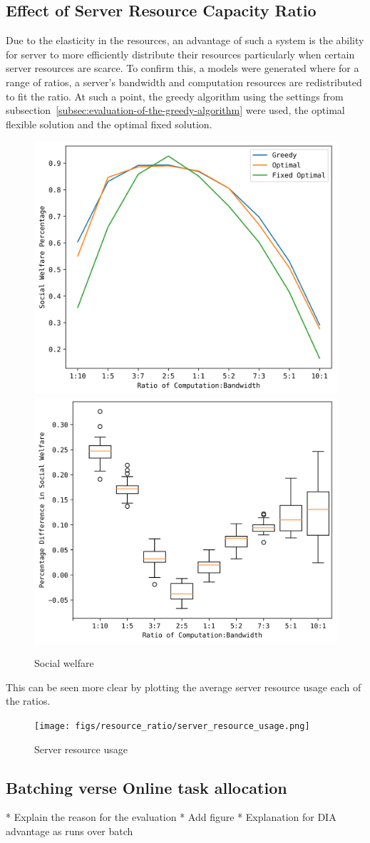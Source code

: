 \subsection{Effect of Server Resource Capacity Ratio}
\label{subsec:affect-of-server-resource-capacity-ratio}
Due to the elasticity in the resources, an advantage of such a system is the ability for server to more efficiently
distribute their resources particularly when certain server resources are scarce. To confirm this, a models were
generated where for a range of ratios, a server's bandwidth and computation resources are redistributed to fit the
ratio. At such a point, the greedy algorithm using the settings from
subsection~\ref{subsec:evaluation-of-the-greedy-algorithm} were used, the optimal flexible solution and the optimal
fixed solution.

\begin{figure}[h]
    \centering
    \includegraphics[width=0.45\linewidth]{figs/resource_ratio/social_welfare_percentage.png}
    \includegraphics[width=0.45\linewidth]{figs/resource_ratio/social_welfare_difference.png}
    \caption{Social welfare}
    \label{fig:resource-ratio-social-welfare}
\end{figure}

This can be seen more clear by plotting the average server resource usage each of the ratios.
\begin{figure}[h]
    \centering
    \texttt{[image: figs/resource\_ratio/server\_resource\_usage.png]}
    \caption{Server resource usage}
    \label{fig:resource-ratio-server-resource-usage}
\end{figure}

\subsection{Batching verse Online task allocation}
\label{subsec:batching-verse-online-task-allocation}
* Explain the reason for the evaluation
* Add figure
* Explanation for DIA advantage as runs over batch
